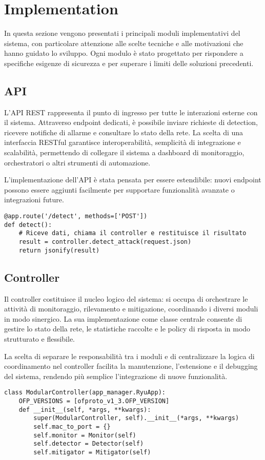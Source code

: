 \chapter{Implementation}

In questa sezione vengono presentati i principali moduli implementativi del sistema, con particolare attenzione alle scelte tecniche e alle motivazioni che hanno guidato lo sviluppo. Ogni modulo è stato progettato per rispondere a specifiche esigenze di sicurezza e per superare i limiti delle soluzioni precedenti.

\section{API}
L’API REST rappresenta il punto di ingresso per tutte le interazioni esterne con il sistema. Attraverso endpoint dedicati, è possibile inviare richieste di detection, ricevere notifiche di allarme e consultare lo stato della rete. La scelta di una interfaccia RESTful garantisce interoperabilità, semplicità di integrazione e scalabilità, permettendo di collegare il sistema a dashboard di monitoraggio, orchestratori o altri strumenti di automazione.\par
L’implementazione dell’API è stata pensata per essere estendibile: nuovi endpoint possono essere aggiunti facilmente per supportare funzionalità avanzate o integrazioni future.
\begin{verbatim}
@app.route('/detect', methods=['POST'])
def detect():
    # Riceve dati, chiama il controller e restituisce il risultato
    result = controller.detect_attack(request.json)
    return jsonify(result)
\end{verbatim}

\section{Controller}
Il controller costituisce il nucleo logico del sistema: si occupa di orchestrare le attività di monitoraggio, rilevamento e mitigazione, coordinando i diversi moduli in modo sinergico. La sua implementazione come classe centrale consente di gestire lo stato della rete, le statistiche raccolte e le policy di risposta in modo strutturato e flessibile.\par
La scelta di separare le responsabilità tra i moduli e di centralizzare la logica di coordinamento nel controller facilita la manutenzione, l’estensione e il debugging del sistema, rendendo più semplice l’integrazione di nuove funzionalità.
\begin{verbatim}
class ModularController(app_manager.RyuApp):
    OFP_VERSIONS = [ofproto_v1_3.OFP_VERSION]
    def __init__(self, *args, **kwargs):
        super(ModularController, self).__init__(*args, **kwargs)
        self.mac_to_port = {}
        self.monitor = Monitor(self)
        self.detector = Detector(self)
        self.mitigator = Mitigator(self)
\end{verbatim}

